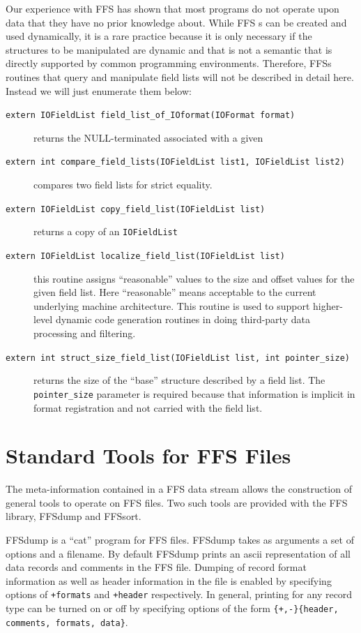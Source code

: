 Our experience with FFS has shown that most programs do not operate upon
data that they have no prior knowledge about.  While FFS
s can be created and used dynamically, it is a rare
practice because it is only necessary if the structures to be manipulated
are dynamic and that is not a semantic that is directly supported by common
programming environments.  Therefore, FFSs routines that query and
manipulate field lists will not be described in detail here.  Instead we
will just enumerate them below:
\begin{description}
\item[{\tt extern IOFieldList field\_list\_of\_IOformat(IOFormat format)}]
returns the NULL-terminated  associated with a given
\item[{\tt extern int compare\_field\_lists(IOFieldList list1, IOFieldList
list2)}]
compares two field lists for strict equality.
\item[{\tt extern IOFieldList copy\_field\_list(IOFieldList list)}]
returns a copy of an {\tt IOFieldList}
\item[{\tt extern IOFieldList localize\_field\_list(IOFieldList list)}]
this routine assigns ``reasonable'' values to the size and offset values
for the given field list.  Here ``reasonable'' means acceptable to the
current underlying machine architecture.  This routine is used to support
higher-level dynamic code generation routines in doing third-party data
processing and filtering.
\item[{\tt extern int struct\_size\_field\_list(IOFieldList list, int pointer\_size)}]
returns the size of the ``base'' structure described by a field list.  The
{\tt pointer\_size} parameter is required because that information is
implicit in format registration and not carried with the field list.
\end{description}

\section{Standard Tools for FFS Files}
The meta-information contained in a FFS data stream allows the construction
of general tools to operate on FFS files.  Two such tools are provided with
the FFS library, FFSdump and FFSsort.

FFSdump is a ``cat'' program for FFS files.  FFSdump takes as arguments a set
of options and a filename.  By default FFSdump prints an ascii representation
of all data records and comments in the FFS file.  Dumping of record format
information as well as header information in the file is enabled by specifying
options of {\tt +formats} and {\tt +header} respectively.  In general,
printing for any record type can be turned on or off by specifying options
of the form {\tt \{+,-\}\{header, comments, formats, data\}}.

